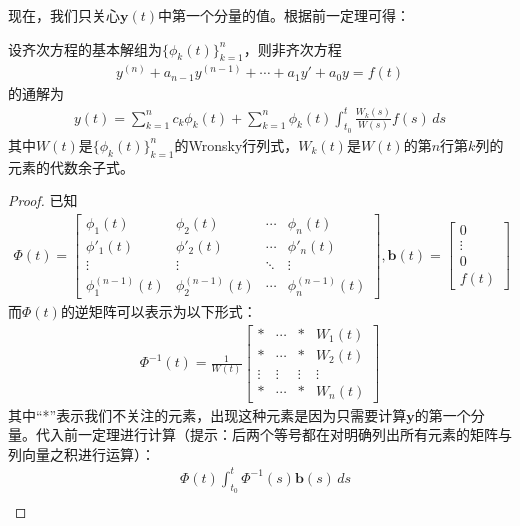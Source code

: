 \documentclass{ctexbook}
\begin{document}
现在，我们只关心$\mathbf{y}(t)$中第一个分量的值。根据前一定理可得：
\begin{theorem}
    设齐次方程的基本解组为$\{\phi_k(t)\}_{k=1}^n$，则非齐次方程\begin{align*}
    y^{(n)}+a_{n-1}y^{(n-1)}+\cdots+a_1y'+a_0y=f(t)
    \end{align*}
    的通解为\begin{align*}
    y(t)=\sum_{k=1}^n c_k\phi_k(t)+\sum_{k=1}^n \phi_k(t)\int_{t_0}^t \frac{W_k(s)}{W(s)}f(s)\,ds
    \end{align*}
    其中$W(t)$是$\{\phi_k(t)\}_{k=1}^n$的Wronsky行列式，$W_k(t)$是$W(t)$的第$n$行第$k$列的元素的代数余子式。
\end{theorem}
\begin{proof}
    已知\begin{align*}
        \Phi(t)=\begin{bmatrix}
        \phi_1(t) & \phi_2(t) & \cdots & \phi_n(t)\\
        \phi'_1(t) & \phi'_2(t) & \cdots & \phi'_n(t)\\
        \vdots & \vdots & \ddots & \vdots\\
        \phi_1^{(n-1)}(t) & \phi_2^{(n-1)}(t) & \cdots & \phi_n^{(n-1)}(t)
        \end{bmatrix},\mathbf{b}(t)=\begin{bmatrix}
        0\\
        \vdots\\
        0\\
        f(t)
        \end{bmatrix}
    \end{align*}
    而$\Phi(t)$的逆矩阵可以表示为以下形式：\begin{align*}
        \Phi^{-1}(t)=\frac{1}{W(t)}\begin{bmatrix}
        * & \cdots & * & W_1(t)\\
        * &  \cdots & * & W_2(t)\\
        \vdots & \vdots & \vdots & \vdots\\
        * &  \cdots & * & W_n(t)
        \end{bmatrix}
    \end{align*}
    其中“*”表示我们不关注的元素，出现这种元素是因为只需要计算$\mathbf{y}$的第一个分量。代入前一定理进行计算（提示：后两个等号都在对明确列出所有元素的矩阵与列向量之积进行运算）：\begin{align*}
        &\Phi(t)\int_{t_0}^t \Phi^{-1}(s)\mathbf{b}(s)\,ds\\

\end{align*}
\end{proof}
\end{document}
